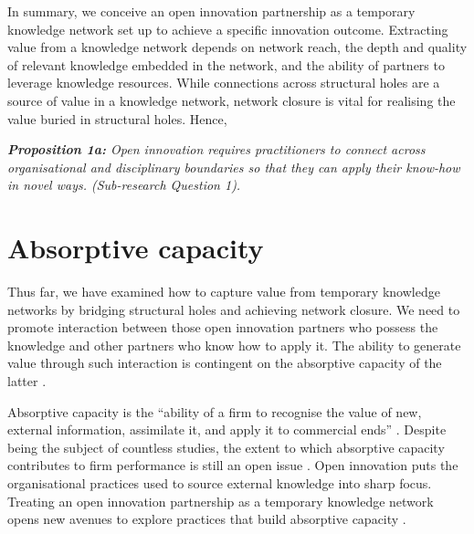 In summary, we conceive an open innovation partnership as a temporary knowledge network set up to achieve a specific innovation outcome. Extracting value from a knowledge network depends on network reach, the depth and quality of relevant knowledge embedded in the network, and the ability of partners to leverage knowledge resources. While connections across structural holes are a source of value in a knowledge network, network closure is vital for realising the value buried in structural holes. Hence, \bigskip

\begin{tcolorbox}
\textit{\textbf{Proposition 1a:} Open  innovation  requires  practitioners  to  connect across organisational and disciplinary boundaries so that they can apply their know-how in novel ways. (Sub-research Question 1).}
\end{tcolorbox}

\section{Absorptive capacity} 

Thus far, we have examined how to capture value from temporary knowledge networks by bridging structural holes and achieving network closure. We need to promote interaction between those open innovation partners who possess the knowledge and other partners who know how to apply it. The ability to generate value through such interaction is contingent on the absorptive capacity of the latter \citep{vanhaverbeke2007connecting,lichtenthaler2009capability,robertson2012managing,xia2016unpacking}. \medskip

Absorptive capacity is the \enquote{ability of a firm to recognise the value of new, external information, assimilate it, and apply it to commercial ends} \citep{cohen1990absorptive}. Despite being the subject of countless studies, the extent to which absorptive capacity contributes to firm performance is still an open issue \citep{omidvar2013revisiting,duchek2013capturing}. Open innovation puts the organisational practices used to source external knowledge into sharp focus. Treating an open innovation partnership as a temporary knowledge network opens new avenues to explore practices that build absorptive capacity \citep{vanhaverbeke2007connecting,xia2016unpacking}. \medskip

